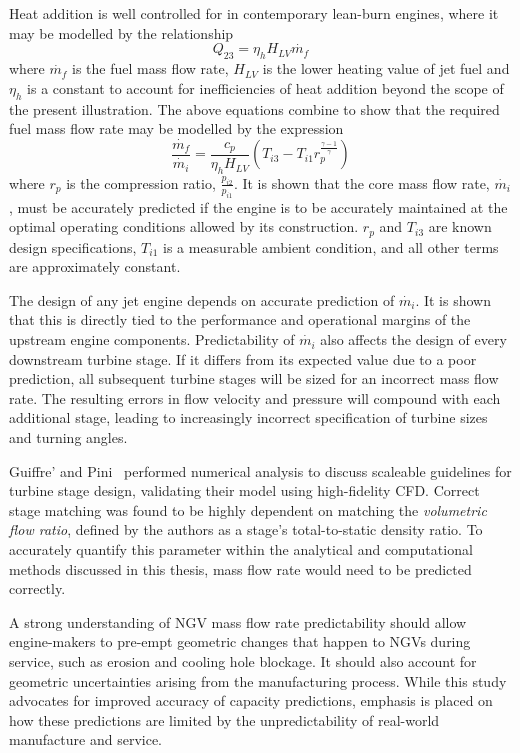 \documentclass[a4paper, 11pt, oneside]{report}
\begin{document}
Heat addition is well controlled for in contemporary lean-burn engines, where it may be modelled by the relationship
\begin{equation}
	Q_{23} = 
	\eta_h
	H_{LV}
	\dot{m_f}
\end{equation}
where $\dot{m_f}$ is the fuel mass flow rate, $H_{LV}$ is the lower heating value of jet fuel and $\eta_h$ is a constant to account for inefficiencies of heat addition beyond the scope of the present illustration. The above equations combine to show that the required fuel mass flow rate may be modelled by the expression
\begin{equation}
	\frac{\dot{m_f}}{\dot{m_i}}
	=
	\frac{c_p}{\eta_{h}H_{LV}}
	\left(
		T_{i3} - 
		T_{i1}
		r_p
		^
		\frac{\gamma-1}{\gamma}
	\right)
\end{equation}
where $r_p$ is the compression ratio, $\frac{p_{i2}}{p_{i1}}$. It is shown that the core mass flow rate, $\dot{m_i}$, must be accurately predicted if the engine is to be accurately maintained at the optimal operating conditions allowed by its construction. $r_p$ and $T_{i3}$ are known design specifications, $T_{i1}$ is a measurable ambient condition, and all other terms are approximately constant. 

The design of any jet engine depends on accurate prediction of $\dot{m_i}$. It is shown that this is directly tied to the performance and operational margins of the upstream engine components. Predictability of $\dot{m_i}$ also affects the design of every downstream turbine stage. If it differs from its expected value due to a poor prediction, all subsequent turbine stages will be sized for an incorrect mass flow rate. The resulting errors in flow velocity and pressure will compound with each additional stage, leading to increasingly incorrect specification of turbine sizes and turning angles.

Guiffre' and Pini~\cite{guiffre_design_guidelines} performed numerical analysis to discuss scaleable guidelines for turbine stage design, validating their model using high-fidelity CFD.  Correct stage matching was found to be highly dependent on matching the \textit{volumetric flow ratio}, defined by the authors as a stage's total-to-static density ratio. To accurately quantify this parameter within the analytical and computational methods discussed in this thesis, mass flow rate would need to be predicted correctly.

A strong understanding of NGV mass flow rate predictability should allow engine-makers to pre-empt geometric changes that happen to NGVs during service, such as erosion and cooling hole blockage. It should also account for geometric uncertainties arising from the manufacturing process. While this study advocates for improved accuracy of capacity predictions, emphasis is placed on how these predictions are limited by the unpredictability of real-world manufacture and service.
\end{document}
